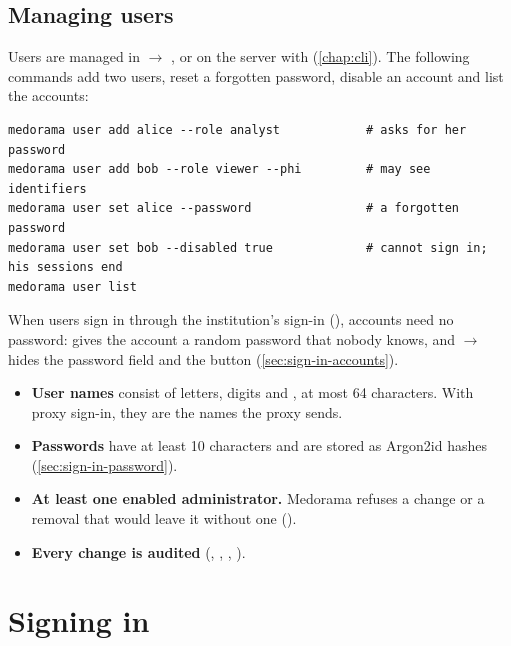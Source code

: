 \subsection{Managing users}
\label{sec:users-privacy-managing}

Users are managed in  $\rightarrow$ , or on the server with
 (\cref{chap:cli}). The following commands add two users, reset a forgotten
password, disable an account and list the accounts:
\begin{lstlisting}[style=shell]
medorama user add alice --role analyst            # asks for her password
medorama user add bob --role viewer --phi         # may see identifiers
medorama user set alice --password                # a forgotten password
medorama user set bob --disabled true             # cannot sign in; his sessions end
medorama user list
\end{lstlisting}
When users sign in through the institution's sign-in (), accounts need
no password:  gives the account a random
password that nobody knows, and  $\rightarrow$  hides the password field and
the  button (\cref{sec:sign-in-accounts}).
\begin{itemize}
\item \textbf{User names} consist of letters, digits and , at most 64 characters.
  With proxy sign-in, they are the names the proxy sends.
\item \textbf{Passwords} have at least 10 characters and are stored as Argon2id hashes
  (\cref{sec:sign-in-password}).
\item \textbf{At least one enabled administrator.} Medorama refuses a change or a removal that
  would leave it without one ().
\item \textbf{Every change is audited} (, ,
  , ).
\end{itemize}

\section{Signing in}
\label{sec:users-privacy-signin}

